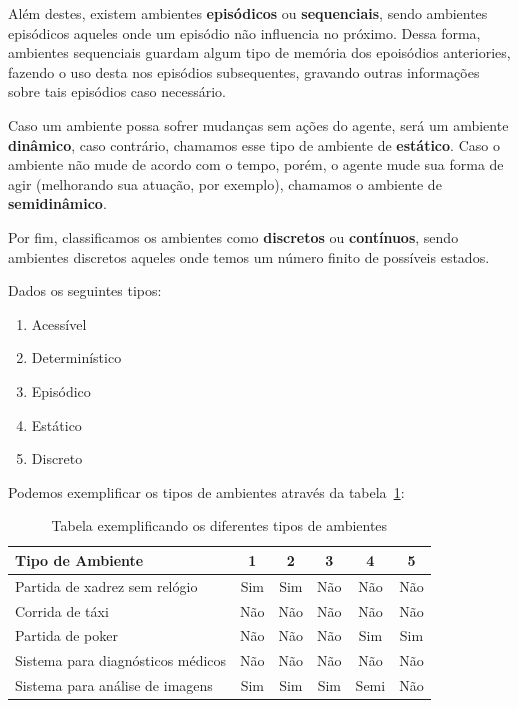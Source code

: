 Além destes, existem ambientes \textbf{episódicos} ou \textbf{sequenciais},
sendo ambientes episódicos aqueles onde um episódio não influencia no próximo.
Dessa forma, ambientes sequenciais guardam algum tipo de memória dos epoisódios
anteriories, fazendo o uso desta nos episódios subsequentes, gravando outras
informações sobre tais episódios caso necessário.

Caso um ambiente possa sofrer mudanças sem ações do agente, será um ambiente
\textbf{dinâmico}, caso contrário, chamamos esse tipo de ambiente de
\textbf{estático}. Caso o ambiente não mude de acordo com o tempo, porém, o
agente mude sua forma de agir (melhorando sua atuação, por exemplo), chamamos
o ambiente de \textbf{semidinâmico}.

Por fim, classificamos os ambientes como \textbf{discretos} ou
\textbf{contínuos}, sendo ambientes discretos aqueles onde temos um número
finito de possíveis estados.

Dados os seguintes tipos:

\begin{enumerate}
    \item Acessível
    \item Determinístico
    \item Episódico
    \item Estático
    \item Discreto
\end{enumerate}

Podemos exemplificar os tipos de ambientes através da
tabela~\ref{tab:ENVEXAMPLETABLE}:

\begin{table}[htb]
    \begin{center}
        \caption{\label{tab:ENVEXAMPLETABLE} Tabela exemplificando os
        diferentes tipos de ambientes}
        \begin{tabular}{| l | c | c | c | c | c |} \hline
            \textbf{Tipo de Ambiente}         & \textbf{1} & \textbf{2} & \textbf{3} & \textbf{4} & \textbf{5} \\ \hline
            Partida de xadrez sem relógio     & Sim        & Sim        & Não        & Não        & Não        \\ \hline
            Corrida de táxi                   & Não        & Não        & Não        & Não        & Não        \\ \hline
            Partida de poker                  & Não        & Não        & Não        & Sim        & Sim        \\ \hline
            Sistema para diagnósticos médicos & Não        & Não        & Não        & Não        & Não        \\ \hline
            Sistema para análise de imagens   & Sim        & Sim        & Sim        & Semi       & Não        \\ \hline
        \end{tabular}
    \end{center}
\end{table}

